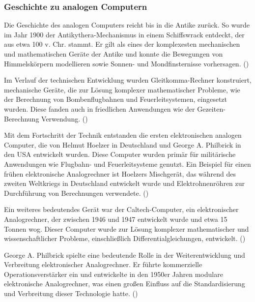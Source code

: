 \subsubsection{Geschichte zu analogen Computern}

Die Geschichte des analogen Computers reicht bis in die Antike zurück. So wurde im Jahr 1900 der Antikythera-Mechanismus in einem Schiffswrack entdeckt, der aus etwa 100 v. Chr. stammt. Er gilt als eines der komplexesten mechanischen und mathematischen Geräte der Antike und konnte die Bewegungen von Himmelskörpern modellieren sowie Sonnen- und Mondfinsternisse vorhersagen. (\cite[vgl. S. 9 f.]{Ulmann2022})

Im Verlauf der technischen Entwicklung wurden Gleitkomma-Rechner konstruiert, mechanische Geräte, die zur Lösung komplexer mathematischer Probleme, wie der Berechnung von Bombenflugbahnen und Feuerleitsystemen, eingesetzt wurden. Diese fanden auch in friedlichen Anwendungen wie der Gezeiten-Berechnung Verwendung. (\cite[vgl. S. 9]{Ulmann2022})

Mit dem Fortschritt der Technik entstanden die ersten elektronischen analogen Computer, die von Helmut Hoelzer in Deutschland und George A. Philbrick in den USA entwickelt wurden. Diese Computer wurden primär für militärische Anwendungen wie Flugbahn- und Feuerleitsysteme genutzt. Ein Beispiel für einen frühen elektronische Analogrechner ist Hoelzers Mischgerät, das während des zweiten Weltkriegs in Deutschland entwickelt wurde und Elektrohnenröhren zur Durchführung von Berechnungen verwendete. (\cite[vgl. S. 41 f.]{Ulmann2022})

Ein weiteres bedeutendes Gerät war der Caltech-Computer, ein elektronischer Analogrechner, der zwischen 1946 und 1947 entwickelt wurde und etwa 15 Tonnen wog. Dieser Computer wurde zur Lösung komplexer mathematischer und wissenschaftlicher Probleme, einschließlich Differentialgleichungen, entwickelt. (\cite[vgl. S. 69]{Ulmann2022})

George A. Philbrick spielte eine bedeutende Rolle in der Weiterentwicklung und Verbreitung elektronischer Analogrechner. Er führte kommerzielle Operationsverstärker ein und entwickelte in den 1950er Jahren modulare elektronische Analogrechner, was einen großen Einfluss auf die Standardisierung und Verbreitung dieser Technologie hatte. (\cite[vgl. S. 136]{Ulmann2022})
